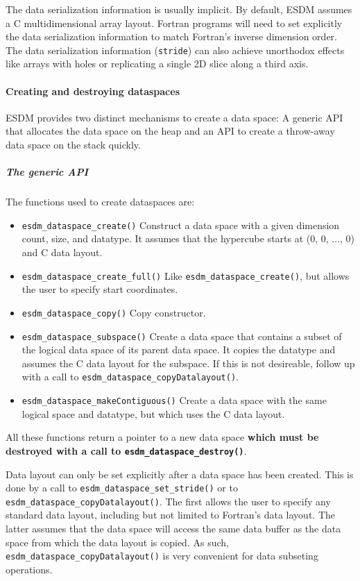 The data serialization information is usually implicit.
By default, ESDM assumes a C multidimensional array layout. 
Fortran programs will need to set explicitly the data serialization information to match Fortran's inverse dimension order. 
The data serialization information (\lstinline|stride|) can also achieve unorthodox effects like arrays with holes or replicating a single 2D slice along a third axis.

\paragraph{Creating and destroying dataspaces}
ESDM provides two distinct mechanisms to create a data space: A generic API that allocates the data space on the heap and an API to create a throw-away data space on the stack quickly.

\subparagraph{The generic API}
The functions used to create dataspaces are:

\begin{itemize}
  \item \lstinline|esdm_dataspace_create()|
    Construct a data space with a given dimension count, size, and datatype. 
    It assumes that the hypercube starts at (0, 0, ..., 0) and C data layout.
  \item \lstinline|esdm_dataspace_create_full()|
    Like \lstinline|esdm_dataspace_create()|, but allows the user to specify start coordinates.
  \item \lstinline|esdm_dataspace_copy()|
    Copy constructor.
  \item \lstinline|esdm_dataspace_subspace()|
    Create a data space that contains a subset of the logical data space of its parent data space. 
    It copies the datatype and assumes the C data layout for the subspace. 
    If this is not desireable, follow up with a call to \lstinline|esdm_dataspace_copyDatalayout()|.
  \item \lstinline|esdm_dataspace_makeContiguous()|
    Create a data space with the same logical space and datatype, but which uses the C data layout.
\end{itemize}

All these functions return a pointer to a new data space \textbf{which must be destroyed with a call to \lstinline|esdm_dataspace_destroy()|}.

Data layout can only be set explicitly after a data space has been created. 
This is done by a call to \lstinline|esdm_dataspace_set_stride()| or to \lstinline|esdm_dataspace_copyDatalayout()|. 
The first allows the user to specify any standard data layout, including but not limited to Fortran's data layout. 
The latter assumes that the data space will access the same data buffer as the data space from which the data layout is copied. 
As such, \lstinline|esdm_dataspace_copyDatalayout()| is very convenient for data subseting operations.

